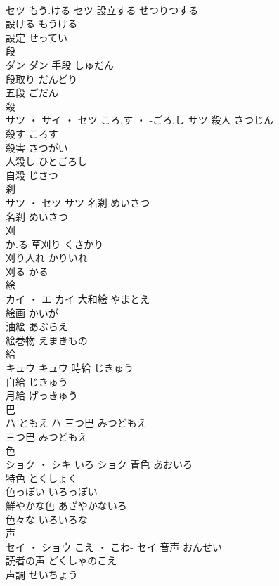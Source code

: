 \documentclass[8pt]{extreport}
\begin{document}
\begin{CJK}{UTF8}{min}
\\	セツ	もう.ける	セツ	設立する	せつりつする	
\\	設ける	もうける	
\\	設定	せってい	
\\	段	
\\	ダン		ダン	手段	しゅだん	
\\	段取り	だんどり	
\\	五段	ごだん	
\\	殺	
\\	サツ ・ サイ ・ セツ	ころ.す ・ -ごろ.し	サツ	殺人	さつじん	
\\	殺す	ころす	
\\	殺害	さつがい	
\\	人殺し	ひとごろし	
\\	自殺	じさつ	
\\	刹	
\\	サツ ・ セツ		サツ	名刹	めいさつ	
\\	名刹	めいさつ	
\\	刈	
\\	か.る														草刈り	くさかり	
\\	刈り入れ	かりいれ	
\\	刈る	かる	
\\	絵	
\\	カイ ・ エ		カイ	大和絵	やまとえ	
\\	絵画	かいが	
\\	油絵	あぶらえ	
\\	絵巻物	えまきもの	
\\	給	
\\	キュウ		キュウ	時給	じきゅう	
\\	自給	じきゅう	
\\	月給	げっきゅう	
\\	巴	
\\	ハ	ともえ	ハ	三つ巴	みつどもえ	
\\	三つ巴	みつどもえ	
\\	色	
\\	ショク ・ シキ	いろ	ショク	青色	あおいろ	
\\	特色	とくしょく	
\\	色っぽい	いろっぽい	
\\	鮮やかな色	あざやかないろ	
\\	色々な	いろいろな	
\\	声	
\\	セイ ・ ショウ	こえ ・ こわ-	セイ	音声	おんせい	
\\	読者の声	どくしゃのこえ	
\\	声調	せいちょう	

\end{CJK}
\end{document}
